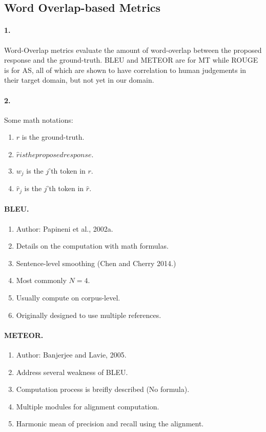 \documentclass[runningheads]{llncs}
\begin{document}
\subsection{Word Overlap-based Metrics}
\paragraph{1.} Word-Overlap metrics evaluate the amount of word-overlap between
the proposed response and the ground-truth.
BLEU and METEOR are for MT while ROUGE is for AS, all of which are shown to have
correlation to human judgements in their target domain, but not yet in our domain.

\paragraph{2.} Some math notations:
\begin{enumerate}
    \item $r$ is the ground-truth.
    \item $\hat{r} is the proposed response.$
    \item $w_j$ is the $j$'th token in $r$.
    \item $\hat{r}_j$ is the $j$'th token in $\hat{r}$.
\end{enumerate}

\paragraph{BLEU.}
\begin{enumerate}
    \item Author: Papineni et al., 2002a.
    \item Details on the computation with math formulas.
    \item Sentence-level smoothing (Chen and Cherry 2014.)
    \item Most commonly $N = 4$.
    \item Usually compute on corpus-level.
    \item Originally designed to use multiple references.
\end{enumerate}

\paragraph{METEOR.}
\begin{enumerate}
    \item Author: Banjerjee and Lavie, 2005.
    \item Address several weakness of BLEU.
    \item Computation process is breifly described (No formula).
    \item Multiple modules for alignment computation.
    \item Harmonic mean of precision and recall using the alignment.
\end{enumerate}
\end{document}
